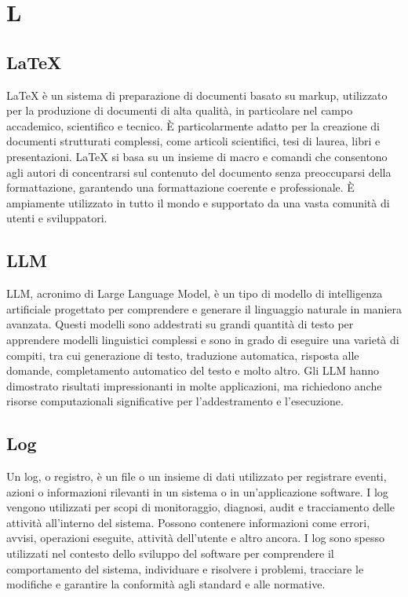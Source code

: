 \section{L}

\vspace{2em}
\subsection*{LaTeX}
LaTeX è un sistema di preparazione di documenti basato su markup, utilizzato per la produzione di documenti di alta qualità, in particolare nel campo accademico, scientifico e tecnico. È particolarmente adatto per la creazione di documenti strutturati complessi, come articoli scientifici, tesi di laurea, libri e presentazioni. LaTeX si basa su un insieme di macro e comandi che consentono agli autori di concentrarsi sul contenuto del documento senza preoccuparsi della formattazione, garantendo una formattazione coerente e professionale. È ampiamente utilizzato in tutto il mondo e supportato da una vasta comunità di utenti e sviluppatori.

\vspace{2em}
\subsection*{LLM}
LLM, acronimo di Large Language Model, è un tipo di modello di intelligenza artificiale progettato per comprendere e generare il linguaggio naturale in maniera avanzata. Questi modelli sono addestrati su grandi quantità di testo per apprendere modelli linguistici complessi e sono in grado di eseguire una varietà di compiti, tra cui generazione di testo, traduzione automatica, risposta alle domande, completamento automatico del testo e molto altro. Gli LLM hanno dimostrato risultati impressionanti in molte applicazioni, ma richiedono anche risorse computazionali significative per l'addestramento e l'esecuzione.

\vspace{2em}
\subsection*{Log}
Un log, o registro, è un file o un insieme di dati utilizzato per registrare eventi, azioni o informazioni rilevanti in un sistema o in un'applicazione software. I log vengono utilizzati per scopi di monitoraggio, diagnosi, audit e tracciamento delle attività all'interno del sistema. Possono contenere informazioni come errori, avvisi, operazioni eseguite, attività dell'utente e altro ancora. I log sono spesso utilizzati nel contesto dello sviluppo del software per comprendere il comportamento del sistema, individuare e risolvere i problemi, tracciare le modifiche e garantire la conformità agli standard e alle normative.
